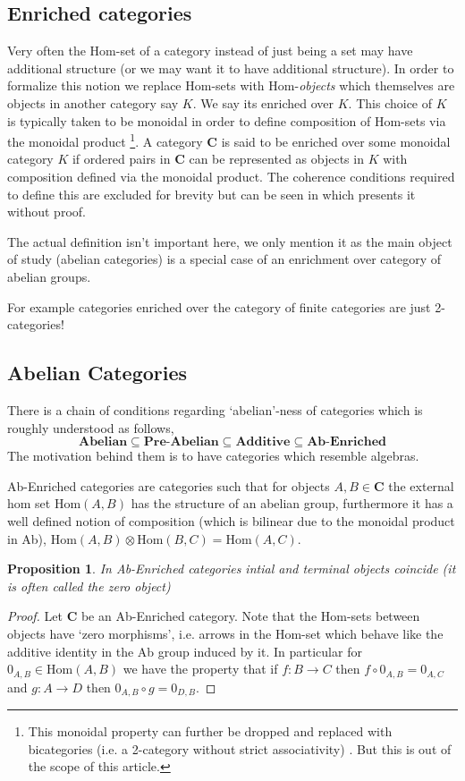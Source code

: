 \documentclass[12pt]{article}
\numberwithin{equation}{section}
\newcommand{\Hom}{{\mathrm{Hom}}}
\newtheorem{proposition}{Proposition}[section]
\begin{document}
\begin{appendices}
		\subsection{Enriched categories}
		Very often the Hom-set of a category instead of just being a set may have additional structure (or we may want it to have additional structure). In order to formalize this notion we replace Hom-sets with Hom-\textit{objects} which themselves are objects in another category say $K$. We say its enriched over $K$. This choice of $K$ is typically taken to be monoidal in order to define composition of Hom-sets via the monoidal product \footnote{This monoidal property can further be dropped and replaced with bicategories (i.e. a 2-category without strict associativity) \cite{garner2015enriched}. But this is out of the scope of this article.}. A category $\mathbf{C}$ is said to be enriched over some monoidal category $K$ if ordered pairs in $\mathbf{C}$ can be represented as objects in $K$ with composition defined via the monoidal product. The coherence conditions required to define this are excluded for brevity but can be seen in \cite[Chp. ~3]{riehl_2014} which presents it without proof.
		
		The actual definition isn't important here, we only mention it as the main object of study (abelian categories) is a special case of an enrichment over category of abelian groups.
		
		For example categories enriched over the category of finite categories are just 2-categories!
		\subsection{Abelian Categories}
		There is a chain of conditions regarding `abelian'-ness of categories which is roughly understood as follows,
		\[ \textbf{Abelian} \subseteq \textbf{Pre-Abelian} \subseteq \textbf{Additive} \subseteq \textbf{Ab-Enriched}\]
		The motivation behind them is to have categories which resemble algebras.
		
		Ab-Enriched categories are categories such that for objects $A,B \in \mathbf{C}$ the external hom set $\Hom(A,B)$ has the structure of an abelian group, furthermore it has a well defined notion of composition (which is bilinear due to the monoidal product in Ab), $\Hom(A,B)\otimes \Hom(B,C) =\Hom(A,C)$. 
		\begin{proposition}
			In Ab-Enriched categories intial and terminal objects coincide (it is often called the zero object)
		\end{proposition}
		\begin{proof}
			Let $\mathbf{C}$ be an Ab-Enriched category. Note that the Hom-sets between objects have `zero morphisms', i.e. arrows in the Hom-set which behave like the additive identity in the Ab group induced by it. In particular for $0_{A,B}\in \Hom(A,B)$ we have the property that if $f:B \to C$ then $f\circ 0_{A,B}=0_{A,C}$ and $g: A \to D$ then $0_{A,B}\circ g=0_{D,B}$.
			

\end{proof}
\end{appendices}
\end{document}
